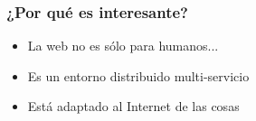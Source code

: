 
\begin{frame}
\frametitle{¿Por qué es interesante?}

\begin{itemize}
   \item La web no es sólo para humanos...
   \item Es un entorno distribuido multi-servicio
   \item Está adaptado al Internet de las cosas 
\end{itemize}

\end{frame}




